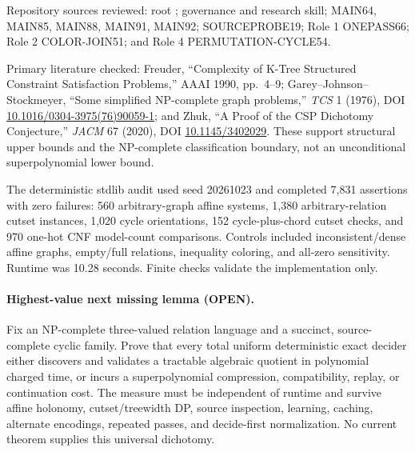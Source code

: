 \documentclass[11pt]{article}
\begin{document}
Repository sources reviewed: root ; governance and research
skill; MAIN64, MAIN85, MAIN88, MAIN91, MAIN92; SOURCEPROBE19; Role 1
ONEPASS66; Role 2 COLOR-JOIN51; and Role 4 PERMUTATION-CYCLE54.

Primary literature checked: Freuder, ``Complexity of K-Tree Structured
Constraint Satisfaction Problems,'' AAAI 1990, pp.~4--9; Garey--Johnson--
Stockmeyer, ``Some simplified NP-complete graph problems,'' \emph{TCS} 1
(1976), DOI \url{10.1016/0304-3975(76)90059-1}; and Zhuk, ``A Proof of the
CSP Dichotomy Conjecture,'' \emph{JACM} 67 (2020), DOI
\url{10.1145/3402029}.  These support structural upper bounds and the
NP-complete classification boundary, not an unconditional superpolynomial
lower bound.

The deterministic stdlib audit used seed 20261023 and completed 7,831
assertions with zero failures: 560 arbitrary-graph affine systems, 1,380
arbitrary-relation cutset instances, 1,020 cycle orientations, 152
cycle-plus-chord cutset checks, and 970 one-hot CNF model-count comparisons.
Controls included inconsistent/dense affine graphs, empty/full relations,
inequality coloring, and all-zero sensitivity.  Runtime was 10.28 seconds.
Finite checks validate the implementation only.

\paragraph{Highest-value next missing lemma (OPEN).}
Fix an NP-complete three-valued relation language and a succinct, source-
complete cyclic family.  Prove that every total uniform deterministic exact
decider either discovers and validates a tractable algebraic quotient in
polynomial charged time, or incurs a superpolynomial compression,
compatibility, replay, or continuation cost.  The measure must be independent
of runtime and survive affine holonomy, cutset/treewidth DP, source inspection,
learning, caching, alternate encodings, repeated passes, and decide-first
normalization.  No current theorem supplies this universal dichotomy.
\end{document}
